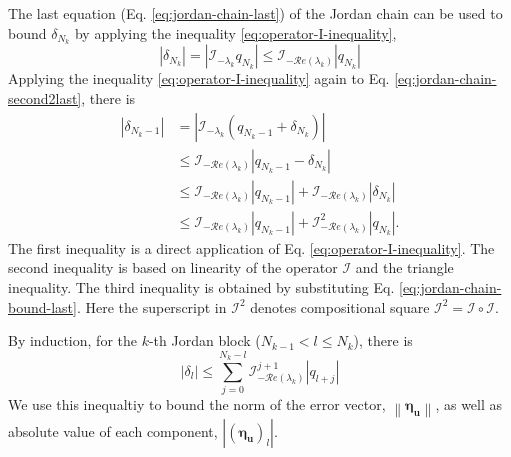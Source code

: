 \documentclass[accepted]{uai2023}
\newcommand{\vect}[1]{\mathbf{#1}}
\newcommand{\Err}{\eta}
\newcommand{\I}{\mathcal{I}}
\renewcommand{\Re}[1]{\mathcal{R}e\left(#1\right)}
\begin{document}
    The last equation (Eq. \ref{eq:jordan-chain-last}) of the Jordan chain can be used to bound $\delta_{N_k}$ by applying the inequality \ref{eq:operator-I-inequality}, 
    \begin{equation}\label{eq:jordan-chain-bound-last}
        |\delta_{N_k}| = \left|\I_{-\lambda_k}q_{N_k}\right| \leq \I_{-\Re{\lambda_k}} |q_{N_k}|
    \end{equation}
    Applying the inequality \ref{eq:operator-I-inequality} again to Eq. \ref{eq:jordan-chain-second2last}, there is
    \begin{align}
        |\delta_{N_k-1}| &= \left|\I_{-\lambda_k}\left(q_{N_k - 1} + \delta_{N_k}\right)\right| \\
        &\leq \I_{-\Re{\lambda_k}} |q_{N_k - 1} - \delta_{N_k}| \\
        &\leq \I_{-\Re{\lambda_k}} |q_{N_k - 1}| + \I_{-\Re{\lambda_k}} |\delta_{N_k}| \\
        &\leq \I_{-\Re{\lambda_k}} |q_{N_k - 1}| + \I_{-\Re{\lambda_k}}^2 |q_{N_k}|.
    \end{align}
    The first inequality is a direct application of Eq. \ref{eq:operator-I-inequality}. 
    The second inequality is based on linearity of the operator $\I$ and the triangle inequality. 
    The third inequality is obtained by substituting Eq. \ref{eq:jordan-chain-bound-last}.
    Here the superscript in $\I^2$ denotes compositional square $\I^2 = \I\circ\I$.

    By induction, for the $k$-th Jordan block ($N_{k-1} < l \leq N_k$), there is
    \begin{equation}\label{eq:system-scalar-inequality-transformed}
        |\delta_{l}|  \leq \sum_{j=0}^{N_k - l} \I_{-\Re{\lambda_k}} ^ {j+1} |q_{l+j}|
    \end{equation}
    We use this inequaltiy to bound the norm of the error vector, $\left\|\pmb{\Err}_{\vect{u}}\right\|$, as well as absolute value of each component, $\left|\left(\pmb{\Err}_{\vect{u}}\right)_l\right|$. 
\end{document}

